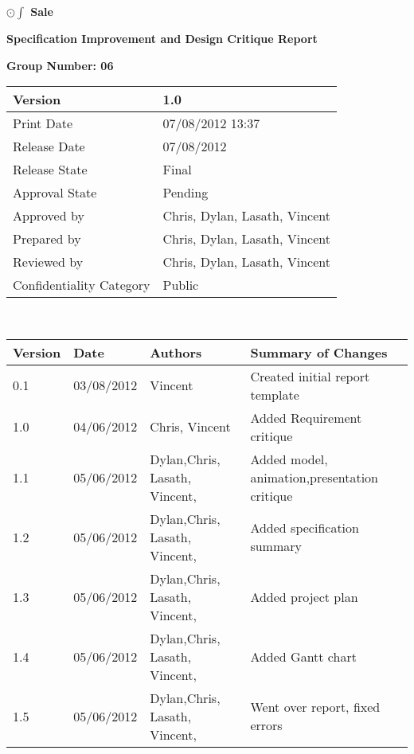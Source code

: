 \documentclass[a4paper]{article}
\begin{document}
\thispagestyle{empty}      %
\begin{center}
\Large\textbf{$\odot\int$ Sale} %

\Large\textbf{Specification Improvement and Design Critique Report}

\bigskip\large\textbf{Group Number: 06}
\end{center}

\vspace*{16.5cm}
\begin{tabular}{|l|l|}
  \hline
  Version         & 1.0\\\hline
  Print Date      & 07/08/2012 13:37\\\hline
  Release Date    & 07/08/2012\\\hline
  Release State   & Final\\\hline
  Approval State  & Pending\\\hline
  Approved by     & Chris, Dylan, Lasath, Vincent\\\hline
  Prepared by     & Chris, Dylan, Lasath, Vincent\\\hline
  Reviewed by     & Chris, Dylan, Lasath, Vincent\\\hline
  Confidentiality Category  & Public\\\hline
\end{tabular}
\pagebreak

\thispagestyle{plain}     %
\setcounter{page}{1}      %
\renewcommand{\thepage}{\roman{page}}  %

\\[2ex]
\begin{tabular}{|l|l|l|l|}
  \hline
  Version & Date & Authors & Summary of Changes\\\hline\hline
  0.1 & 03/08/2012     &    Vincent     &    Created initial report template              \\\hline
  1.0 & 04/06/2012     &      Chris, Vincent  &    Added Requirement critique               \\\hline
  1.1 & 05/06/2012     &      Dylan,Chris, Lasath, Vincent,   &    Added model, animation,presentation critique     \\\hline
   1.2 & 05/06/2012     &      Dylan,Chris, Lasath, Vincent,   &    Added specification summary \\\hline
    1.3 & 05/06/2012     &      Dylan,Chris, Lasath, Vincent,   &    Added project plan \\\hline
     1.4 & 05/06/2012     &      Dylan,Chris, Lasath, Vincent,   &    Added Gantt chart \\\hline
      1.5 & 05/06/2012     &      Dylan,Chris, Lasath, Vincent,   &    Went over report, fixed errors \\\hline
\end{tabular}
\end{document}
